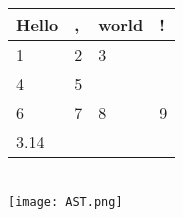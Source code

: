 \documentclass{article}
\begin{document}
\begin{tabular}{|l|l|l|l|}
\hline
Hello & , & world & ! \\ \hline
1 & 2 & 3 &  \\ \hline
4 & 5 &  &  \\ \hline
6 & 7 & 8 & 9 \\ \hline
3.14 &  &  &  \\ \hline
\end{tabular} \\
\texttt{[image: AST.png]} \\
\end{document}
